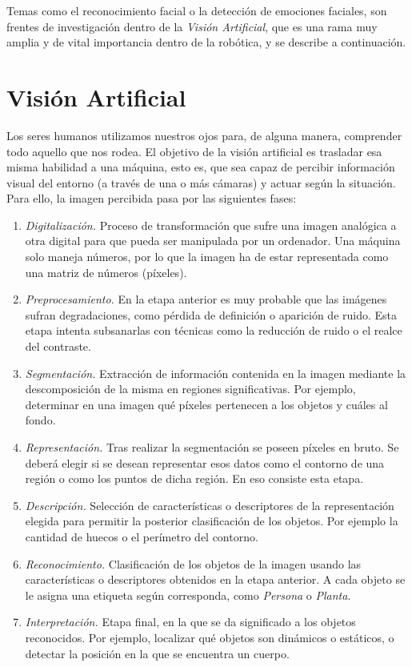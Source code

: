 Temas como el reconocimiento facial o la detección de emociones faciales, son frentes de investigación dentro de la \textit{Visión Artificial}, que es una rama muy amplia y de vital importancia dentro de la robótica, y se describe a continuación.

\section{Visión Artificial}

Los seres humanos utilizamos nuestros ojos para, de alguna manera, comprender todo aquello que nos rodea. El objetivo de la visión artificial es trasladar esa misma habilidad a una máquina, esto es, que sea capaz de percibir información visual del entorno (a través de una o más cámaras) y actuar según la situación. Para ello, la imagen percibida pasa por las siguientes fases:

\begin{enumerate}
    \item \textit{Digitalización.} Proceso de transformación que sufre una imagen analógica a otra digital para que pueda ser manipulada por un ordenador. Una máquina solo maneja números, por lo que la imagen ha de estar representada como una matriz de números (píxeles).
    
    \item \textit{Preprocesamiento.} En la etapa anterior es muy probable que las imágenes sufran degradaciones, como pérdida de definición o aparición de ruido. Esta etapa intenta subsanarlas con técnicas como la reducción de ruido o el realce del contraste.
    
    \item \textit{Segmentación.} Extracción de información contenida en la imagen mediante la descomposición de la misma en regiones significativas. Por ejemplo, determinar en una imagen qué píxeles pertenecen a los objetos y cuáles al fondo.
    
    \item \textit{Representación.} Tras realizar la segmentación se poseen píxeles en bruto. Se deberá elegir si se desean representar esos datos como el contorno de una región o como los puntos de dicha región. En eso consiste esta etapa.
    
    \item \textit{Descripción.} Selección de características o descriptores de la representación elegida para permitir la posterior clasificación de los objetos. Por ejemplo la cantidad de huecos o el perímetro del contorno.
    
    \item \textit{Reconocimiento.} Clasificación de los objetos de la imagen usando las características o descriptores obtenidos en la etapa anterior. A cada objeto se le asigna una etiqueta según corresponda, como \textit{Persona} o \textit{Planta}.
    
    \item \textit{Interpretación.} Etapa final, en la que se da significado a los objetos reconocidos. Por ejemplo, localizar qué objetos son dinámicos o estáticos, o detectar la posición en la que se encuentra un cuerpo.
\end{enumerate}

